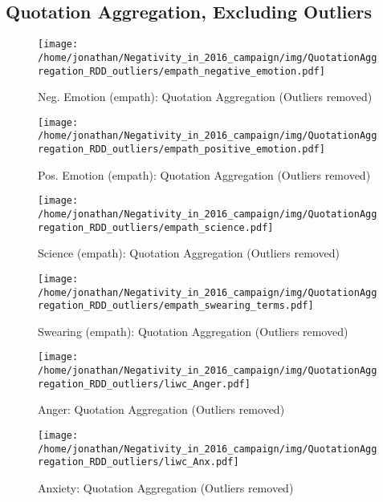 \subsection{Quotation Aggregation, Excluding Outliers}

\begin{figure}[h]\centering
	\texttt{[image: /home/jonathan/Negativity\_in\_2016\_campaign/img/QuotationAggregation\_RDD\_outliers/empath\_negative\_emotion.pdf]}
	\caption{Neg. Emotion (empath): Quotation Aggregation (Outliers removed)}
	\label{fig: qa_Neg. Emotion (empath)}
\end{figure}

\begin{figure}[h]\centering
	\texttt{[image: /home/jonathan/Negativity\_in\_2016\_campaign/img/QuotationAggregation\_RDD\_outliers/empath\_positive\_emotion.pdf]}
	\caption{Pos. Emotion (empath): Quotation Aggregation (Outliers removed)}
	\label{fig: qa_Pos. Emotion (empath)}
\end{figure}

\begin{figure}[h]\centering
	\texttt{[image: /home/jonathan/Negativity\_in\_2016\_campaign/img/QuotationAggregation\_RDD\_outliers/empath\_science.pdf]}
	\caption{Science (empath): Quotation Aggregation (Outliers removed)}
	\label{fig: qa_Science (empath)}
\end{figure}

\begin{figure}[h]\centering
	\texttt{[image: /home/jonathan/Negativity\_in\_2016\_campaign/img/QuotationAggregation\_RDD\_outliers/empath\_swearing\_terms.pdf]}
	\caption{Swearing (empath): Quotation Aggregation (Outliers removed)}
	\label{fig: qa_Swearing (empath)}
\end{figure}

\begin{figure}[h]\centering
	\texttt{[image: /home/jonathan/Negativity\_in\_2016\_campaign/img/QuotationAggregation\_RDD\_outliers/liwc\_Anger.pdf]}
	\caption{Anger: Quotation Aggregation (Outliers removed)}
	\label{fig: qa_Anger}
\end{figure}

\begin{figure}[h]\centering
	\texttt{[image: /home/jonathan/Negativity\_in\_2016\_campaign/img/QuotationAggregation\_RDD\_outliers/liwc\_Anx.pdf]}
	\caption{Anxiety: Quotation Aggregation (Outliers removed)}
	\label{fig: qa_Anxiety}
\end{figure}

